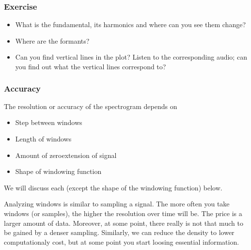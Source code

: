 \documentclass[letterpaper,10pt,english]{jupyterBook}
\begin{document}
\subsubsection{Exercise}
\label{\detokenize{Representations/Short-time_analysis:exercise}}\begin{itemize}
\item {} 
\sphinxAtStartPar
What is the fundamental, its harmonics and where can you see them change?

\item {} 
\sphinxAtStartPar
Where are the formants?

\item {} 
\sphinxAtStartPar
Can you find vertical lines in the plot? Listen to the corresponding audio; can you find out what the vertical lines correspond to?

\end{itemize}


\subsubsection{Accuracy}
\label{\detokenize{Representations/Short-time_analysis:accuracy}}
\sphinxAtStartPar
The resolution or accuracy of the spectrogram depends on
\begin{itemize}
\item {} 
\sphinxAtStartPar
Step between windows

\item {} 
\sphinxAtStartPar
Length of windows

\item {} 
\sphinxAtStartPar
Amount of zero\sphinxhyphen{}extension of signal

\item {} 
\sphinxAtStartPar
Shape of windowing function

\end{itemize}

\sphinxAtStartPar
We will discuss each (except the shape of the windowing function) below.

\sphinxAtStartPar
Analyzing windows is similar to sampling a signal. The more often you take windows (or samples), the higher the resolution over time will be. The price is a larger amount of data. Moreover, at some point, there really is not that much to be gained by a denser sampling. Similarly, we can reduce the density to lower computationaly cost, but at some point you start loosing essential information.
\end{document}
